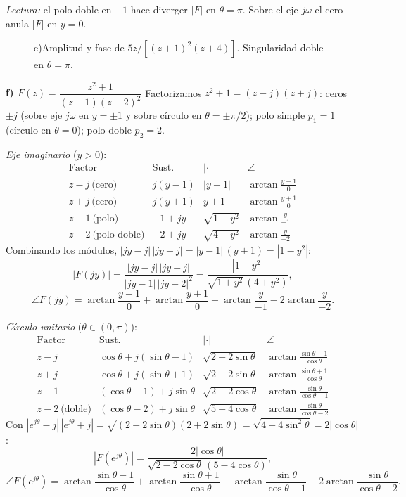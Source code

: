 \documentclass[10pt,a4paper]{article}
\begin{document}
\noindent\textit{Lectura:} el polo doble en $-1$ hace diverger $|F|$ en $\theta=\pi$. Sobre el eje $j\omega$ el cero anula $|F|$ en $y=0$.

\begin{figure}[H]\centering
	
	\caption{e)\enspace Amplitud y fase de $5z/[(z+1)^2(z+4)]$. Singularidad doble en $\theta=\pi$.}
	\label{fig:resp16e}
\end{figure}

\bigskip

\noindent\textbf{f) $F(z)=\dfrac{z^2+1}{(z-1)(z-2)^2}$}\;\textemdash\; Factorizamos $z^2+1=(z-j)(z+j)$: ceros $\pm j$ (sobre eje $j\omega$ en $y=\pm 1$ y sobre círculo en $\theta=\pm\pi/2$); polo simple $p_1=1$ (círculo en $\theta=0$); polo doble $p_2=2$.

\medskip
\noindent\textit{Eje imaginario} ($y>0$):
\[
	\renewcommand{\arraystretch}{1.3}
	\begin{array}{l|c|c|c}
	\text{Factor} & \text{Sust.} & |\cdot| & \angle \\\hline
	z-j\ \text{(cero)}          & j(y-1) & |y-1|        & \arctan\tfrac{y-1}{0} \\
	z+j\ \text{(cero)}          & j(y+1) & y+1          & \arctan\tfrac{y+1}{0} \\
	z-1\ \text{(polo)}          & -1+jy  & \sqrt{1+y^2} & \arctan\tfrac{y}{-1} \\
	z-2\ \text{(polo doble)}    & -2+jy  & \sqrt{4+y^2} & \arctan\tfrac{y}{-2}
	\end{array}
\]
Combinando los módulos, $|jy-j|\,|jy+j| = |y-1|\,(y+1) = |1-y^2|$:
\[
	|F(jy)| = \frac{|jy-j|\,|jy+j|}{|jy-1|\,|jy-2|^2} = \frac{|1-y^2|}{\sqrt{1+y^2}\,(4+y^2)},
\]
\[
	\angle F(jy) = \arctan\!\frac{y-1}{0} + \arctan\!\frac{y+1}{0} - \arctan\!\frac{y}{-1} - 2\arctan\!\frac{y}{-2}.
\]

\medskip
\noindent\textit{Círculo unitario} ($\theta\in(0,\pi)$):
\[
	\renewcommand{\arraystretch}{1.3}
	\begin{array}{l|c|c|c}
	\text{Factor} & \text{Sust.} & |\cdot| & \angle \\\hline
	z-j          & \cos\theta+j(\sin\theta-1) & \sqrt{2-2\sin\theta} & \arctan\tfrac{\sin\theta-1}{\cos\theta} \\
	z+j          & \cos\theta+j(\sin\theta+1) & \sqrt{2+2\sin\theta} & \arctan\tfrac{\sin\theta+1}{\cos\theta} \\
	z-1          & (\cos\theta-1)+j\sin\theta & \sqrt{2-2\cos\theta} & \arctan\tfrac{\sin\theta}{\cos\theta-1} \\
	z-2\ \text{(doble)} & (\cos\theta-2)+j\sin\theta & \sqrt{5-4\cos\theta} & \arctan\tfrac{\sin\theta}{\cos\theta-2}
	\end{array}
\]
Con $|e^{j\theta}-j|\,|e^{j\theta}+j|=\sqrt{(2-2\sin\theta)(2+2\sin\theta)}=\sqrt{4-4\sin^2\theta}=2|\cos\theta|$:
\[
	|F(e^{j\theta})| = \frac{2|\cos\theta|}{\sqrt{2-2\cos\theta}\,(5-4\cos\theta)},
\]
\[
	\angle F(e^{j\theta}) = \arctan\!\frac{\sin\theta-1}{\cos\theta} + \arctan\!\frac{\sin\theta+1}{\cos\theta} - \arctan\!\frac{\sin\theta}{\cos\theta-1} - 2\arctan\!\frac{\sin\theta}{\cos\theta-2}.
\]
\end{document}
